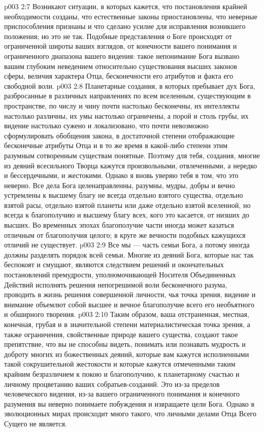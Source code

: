 \vs p003 2:7 Возникают ситуации, в которых кажется, что постановления крайней необходимости созданы, что естественные законы приостановлены, что неверные приспособления признаны и что сделано усилие для исправления возникшего положения; но это не так. Подобные представления о Боге происходят от ограниченной широты ваших взглядов, от конечности вашего понимания и ограниченного диапазона вашего видения: такое непонимание Бога вызвано вашим глубоким неведением относительно существования высших законов сферы, величия характера Отца, бесконечности его атрибутов и факта его свободной воли.
\vs p003 2:8 Планетарные создания, в которых пребывает дух Бога, разбросанные в различных направлениях по всем вселенным, существующим в пространстве, по числу и чину почти настолько бесконечны, их интеллекты настолько различны, их умы настолько ограничены, а порой и столь грубы, их видение настолько сужено и локализовано, что почти невозможно сформулировать обобщения закона, в достаточной степени отображающие бесконечные атрибуты Отца и в то же время в какой\hyp{}либо степени этим разумным сотворенным существам понятные. Поэтому для тебя, создания, многие из деяний всесильного Творца кажутся произвольными, отвлеченными, а нередко и бессердечными, и жестокими. Однако я вновь уверяю тебя в том, что это неверно. Все дела Бога целенаправленны, разумны, мудры, добры и вечно устремлены к высшему благу не всегда отдельно взятого существа, отдельно взятой расы, отдельно взятой планеты или даже отдельно взятой вселенной, но всегда к благополучию и высшему благу всех, кого это касается, от низших до высших. Во временных эпохах благополучие части иногда может казаться отличным от благополучия целого; в круге же вечности подобных кажущихся отличий не существует.
\vs p003 2:9 Все мы --- часть семьи Бога, а потому иногда должны разделять порядок всей семьи. Многие из деяний Бога, которые нас так беспокоят и смущают, являются следствием решений и окончательных постановлений премудрости, уполномочивающей Носителя Объединенных Действий исполнять решения непогрешимой воли бесконечного разума, проводить в жизнь решения совершенной личности, чья точка зрения, видение и внимание объемлют собой высшее и вечное благополучие всего его необъятного и обширного творения.
\vs p003 2:10 Таким образом, ваша отстраненная, местная, конечная, грубая и в значительной степени материалистическая точка зрения, а также ограничения, свойственные природе вашего существа, создают такое препятствие, что вы не способны видеть, понимать или познавать мудрость и доброту многих из божественных деяний, которые вам кажутся исполненными такой сокрушительной жестокости и которые кажутся отмеченными таким крайним безразличием к покою и благополучию, к планетарному счастью и личному процветанию ваших собратьев\hyp{}созданий. Это из\hyp{}за пределов человеческого видения, из\hyp{}за вашего ограниченного понимания и конечного разумения вы неверно понимаете побуждения и извращаете цели Бога. Однако в эволюционных мирах происходит много такого, что личными делами Отца Всего Сущего не является.
